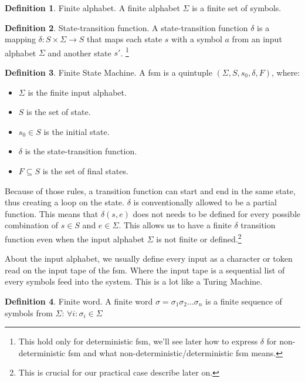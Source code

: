\documentclass[12pt]{article}
\theoremstyle{definition}
\newtheorem{definition}{Definition}[section]
\theoremstyle{definition}
\begin{document}
\theoremstyle{definition}
\begin{definition}{Finite alphabet.} A finite alphabet $\Sigma$ is a finite set of symbols.
\end{definition}

\theoremstyle{definition}
\begin{definition}{State-transition function.} A state-transition function $\delta$ is a mapping $\delta:S\times \Sigma \rightarrow S$ that maps each state $s$ with a symbol $a$ from an input alphabet $\Sigma$ and another state $s'$.
\footnote{This hold only for deterministic \gls{fsm}, we'll see later how to express $\delta$ for non-deterministic \gls{fsm} and what non-deterministic/deterministic \gls{fsm} means.}
\end{definition}

\theoremstyle{definition}
\begin{definition}{Finite State Machine.} A \gls{fsm} is a quintuple $(\Sigma, S, s_{0},\delta, F)$, where:
\begin{itemize}
\item $\Sigma$ is the finite input alphabet.
\item $S$ is the set of state.
\item $s_{0} \in S$ is the initial state.
\item $\delta$ is the state-transition function.
\item $F \subseteq S$ is the set of final states.
\end{itemize}
\end{definition}

Because of those rules, a transition function can start and end in the same state, thus creating a loop on the state. $\delta$ is conventionally allowed to be a partial function. This means that $\delta(s, e)$ does not needs to be defined for every possible combination of $s \in S$ and $e \in \Sigma$. This allows us to have a finite $\delta$ transition function even when the input alphabet $\Sigma$ is not finite or defined.\footnote{This is crucial for our practical case describe later on.}

About the input alphabet, we usually define every input as a character or token read on the input tape of the \gls{fsm}. Where the input tape is a sequential list of every symbols feed into the system. This is a lot like a Turing Machine.

\theoremstyle{definition}
\begin{definition}{Finite word.} A finite word $\sigma = \sigma_1 \sigma_2 ... \sigma_n$ is a finite sequence of symbols from $\Sigma$: $\forall i: \sigma_i \in \Sigma$
\end{definition}
\end{document}
